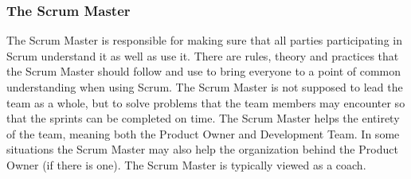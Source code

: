 \subsubsection{The Scrum Master}


The Scrum Master is responsible for making sure that all parties participating in Scrum understand it as well as use it\cite{scrumguide11}.  There are rules, theory and practices that the Scrum Master should follow and use to bring everyone to a point of common understanding when using Scrum\cite{scrumguide11}. The Scrum Master is not supposed to lead the team as a whole, but to solve problems that the team members may encounter so that the sprints can be completed on time\cite{scrumguide11}. The Scrum Master helps the entirety of the team, meaning both the Product Owner and Development Team\cite{scrumguide11}. In some situations the Scrum Master may also help the organization behind the Product Owner (if there is one). The Scrum Master is typically viewed as a coach\cite{scrumguide11}.